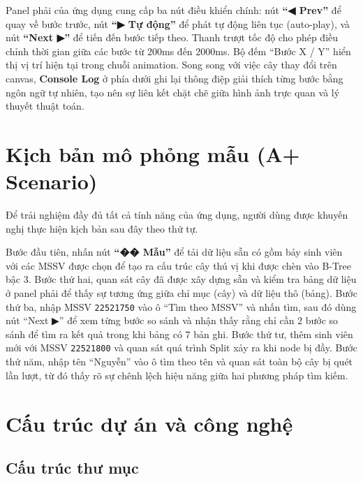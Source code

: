 \documentclass[12pt,a4paper]{article}
\begin{document}
\medskip

Panel phải của ứng dụng cung cấp ba nút điều khiển chính: nút \textbf{``◀ Prev''} để quay về bước trước, nút \textbf{``▶ Tự động''} để phát tự động liên tục (auto-play), và nút \textbf{``Next ▶''} để tiến đến bước tiếp theo. Thanh trượt tốc độ cho phép điều chỉnh thời gian giữa các bước từ 200ms đến 2000ms. Bộ đếm ``Bước X / Y'' hiển thị vị trí hiện tại trong chuỗi animation. Song song với việc cây thay đổi trên canvas, \textbf{Console Log} ở phía dưới ghi lại thông điệp giải thích từng bước bằng ngôn ngữ tự nhiên, tạo nên sự liên kết chặt chẽ giữa hình ảnh trực quan và lý thuyết thuật toán.

\section{Kịch bản mô phỏng mẫu (A+ Scenario)}

Để trải nghiệm đầy đủ tất cả tính năng của ứng dụng, người dùng được khuyến nghị thực hiện kịch bản sau đây theo thứ tự.

Bước đầu tiên, nhấn nút \textbf{``�� Mẫu''} để tải dữ liệu sẵn có gồm bảy sinh viên với các MSSV được chọn để tạo ra cấu trúc cây thú vị khi được chèn vào B-Tree bậc 3. Bước thứ hai, quan sát cây đã được xây dựng sẵn và kiểm tra bảng dữ liệu ở panel phải để thấy sự tương ứng giữa chỉ mục (cây) và dữ liệu thô (bảng). Bước thứ ba, nhập MSSV \texttt{22521750} vào ô ``Tìm theo MSSV'' và nhấn tìm, sau đó dùng nút ``Next ▶'' để xem từng bước so sánh và nhận thấy rằng chỉ cần 2 bước so sánh để tìm ra kết quả trong khi bảng có 7 bản ghi. Bước thứ tư, thêm sinh viên mới với MSSV \texttt{22521800} và quan sát quá trình Split xảy ra khi node bị đầy. Bước thứ năm, nhập tên ``Nguyễn'' vào ô tìm theo tên và quan sát toàn bộ cây bị quét lần lượt, từ đó thấy rõ sự chênh lệch hiệu năng giữa hai phương pháp tìm kiếm.

\section{Cấu trúc dự án và công nghệ}

\subsection{Cấu trúc thư mục}
\end{document}
